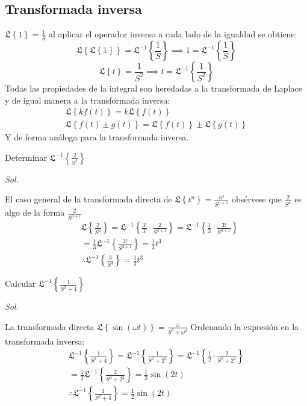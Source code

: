 \subsection{Transformada inversa}
$\mathfrak{L}\left\{1\right\}= \frac{1}{S}$ al aplicar el operador inverso a cada lado de la igualdad se obtiene:
\begin{equation}
    \mathfrak{L}\left\{\mathfrak{L}\left\{1\right\} \right\} = \mathfrak{L}^{- 1}\left\{\frac{1}{S}\right\}\implies 1 = \mathfrak{L}^{ -1}\left\{\frac{1}{S}\right\}
\end{equation}
\begin{equation}
    \mathfrak{L}\left\{t\right\} = \frac{1}{S^{2}}\implies t = \mathfrak{L}^{ -1}\left\{\frac{1}{S^2}\right\}
\end{equation}
Todas las propiedades de la integral son heredadas a la transformada de Laplace y de igual manera a la transformada inversa:
\begin{align}
    \mathfrak{L}\left\{kf(t)\right\} = k\mathfrak{L}\left\{f(t)\right\}\\
    \mathfrak{L}\left\{f(t)\pm g(t) \right\} = \mathfrak{L}\left\{f(t)\right\}\pm \mathfrak{L}\left\{g(t)\right\}
\end{align}
Y de forma  análoga para la transformada inversa.
\begin{example}
    Determinar $\mathfrak{L}^{-1}\left\{\frac{2}{S^4} \right\}$
\end{example}
\textit{ Sol. }

El caso general de la transformada directa de $\mathfrak{L}\left\{t^n\right\}= \frac{n!}{S^{n+1}}$
obsérvese que $\frac{2}{S^4}$ es algo de la forma $\frac{2}{S^{3+1}}$
\begin{align*}
    &\mathfrak{L}\left\{\frac{2}{S^4}\right\} = \mathfrak{L}^{- 1}\left\{\frac{3!}{3!}\cdot \frac{2}{S^{3 +1}}\right\} = \mathfrak{L}^{ -1}\left\{\frac{1}{3}\cdot \frac{3!}{S^{3 +1}}\right\}\\
    &= \frac{1}{3}\mathfrak{L}^{ -1}\left\{\frac{3!}{S^{3 +1}}\right\} = \frac{1}{3}t^3\\
    &\therefore \mathfrak{L}^{ -1}\left\{\frac{3}{S^4}\right\} = \frac{1}{3}t^3
\end{align*}

\begin{example}
    Calcular $\mathfrak{L}^{-1}\left\{\frac{1}{S^2+4}\right\}$
\end{example}
\textit{ Sol. }

La transformada directa $\mathfrak{L}\left\{\sin{(\omega t)}\right\}= \frac{\omega}{S^2+\omega^2}$
Ordenando la expresión en la transformada inversa:
\begin{align*}
    \mathfrak{L}^{ -1}\left\{\frac{1}{S^2 +4}\right\} = \mathfrak{L}^{- 1}\left\{\frac{1}{S^2 +2^2}\right\} = \mathfrak{L}^{ -1}\left\{\frac{1}{2}\cdot \frac{2}{S^2 +2^2}\right\}\\
    = \frac{1}{2}\mathfrak{L}^{ -1}\left\{\frac{2}{S^2 + 2^2}\right\} = \frac{1}{2} \sin{(2t)}\\
    \therefore \mathfrak{L}^{ -1}\left\{\frac{1}{S^2 +4}\right\} = \frac{1}{2} \sin{(2t)}  
\end{align*}

